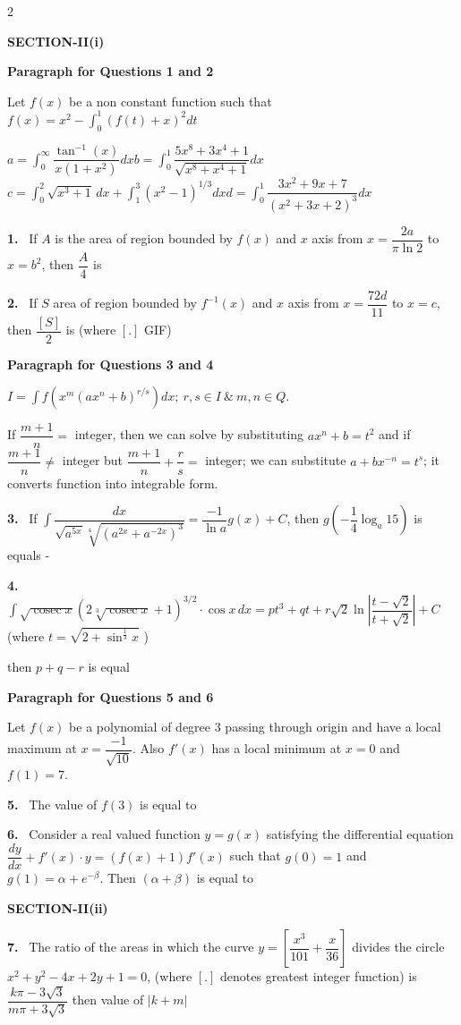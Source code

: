 \documentclass[10pt]{extarticle}
\newcommand{\sect}[1]{\par\smallskip\noindent\textbf{#1}\par}
\newcommand{\qn}[1]{\par\smallskip\noindent\textbf{#1.}~}
\newcommand{\paraq}[2]{\par\smallskip\noindent\textbf{Paragraph for Questions #1 and #2}\par}
\begin{document}
\begin{multicols}{2}
\sect{SECTION-II(i)}
\paraq{1}{2}
Let $f(x)$ be a non constant function such that $f(x)=x^2-\displaystyle\int_0^1(f(t)+x)^2dt$
\begin{center}
$a=\displaystyle\int_0^\infty\dfrac{\tan^{-1}(x)}{x(1+x^2)}dx$\hfill $b=\displaystyle\int_0^1\dfrac{5x^8+3x^4+1}{\sqrt{x^8+x^4+1}}dx$\\[6pt]
$c=\displaystyle\int_0^2\sqrt{x^3+1}\,dx+\int_1^3\left(x^2-1\right)^{1/3}dx$\hfill $d=\displaystyle\int_0^1\dfrac{3x^2+9x+7}{(x^2+3x+2)^3}dx$
\end{center}

\qn{1} If $A$ is the area of region bounded by $f(x)$ and $x$ axis from $x=\dfrac{2a}{\pi\ln2}$ to $x=b^2$, then $\dfrac{A}{4}$ is

\qn{2} If $S$ area of region bounded by $f^{-1}(x)$ and $x$ axis from $x=\dfrac{72d}{11}$ to $x=c$, then $\dfrac{[S]}{2}$ is (where $[.]$ GIF)

\paraq{3}{4}
$I=\displaystyle\int f\left(x^m(ax^n+b)^{r/s}\right)dx;\ r,s\in I\ \&\ m,n\in Q.$

If $\dfrac{m+1}{n}=$ integer, then we can solve by substituting $ax^n+b=t^2$ and if $\dfrac{m+1}{n}\ne$ integer but $\dfrac{m+1}{n}+\dfrac{r}{s}=$ integer; we can substitute $a+bx^{-n}=t^s$; it converts function into integrable form.

\qn{3} If $\displaystyle\int\dfrac{dx}{\sqrt{a^{5x}}\sqrt[4]{\left(a^{2x}+a^{-2x}\right)^3}}=\dfrac{-1}{\ln a}g(x)+C$, then $g\left(-\dfrac14\log_a15\right)$ is equals -

\qn{4} $\displaystyle\int\sqrt{\operatorname{cosec}x}\left(2\sqrt[3]{\operatorname{cosec}x}+1\right)^{3/2}\cdot\cos x\,dx=pt^3+qt+r\sqrt2\ln\left|\dfrac{t-\sqrt2}{t+\sqrt2}\right|+C$ (where $t=\sqrt{2+\sin^{\frac13}x}$ )

then $p+q-r$ is equal

\paraq{5}{6}
Let $f(x)$ be a polynomial of degree 3 passing through origin and have a local maximum at $x=\dfrac{-1}{\sqrt{10}}$. Also $f'(x)$ has a local minimum at $x=0$ and $f(1)=7$.

\qn{5} The value of $f(3)$ is equal to

\qn{6} Consider a real valued function $y=g(x)$ satisfying the differential equation $\dfrac{dy}{dx}+f'(x)\cdot y=(f(x)+1)f'(x)$ such that $g(0)=1$ and $g(1)=\alpha+e^{-\beta}$. Then $(\alpha+\beta)$ is equal to

\sect{SECTION-II(ii)}
\qn{7} The ratio of the areas in which the curve $y=\left[\dfrac{x^3}{101}+\dfrac{x}{36}\right]$ divides the circle $x^2+y^2-4x+2y+1=0$, (where $[.]$ denotes greatest integer function) is $\dfrac{k\pi-3\sqrt3}{m\pi+3\sqrt3}$ then value of $|k+m|$ \underline{\hspace{2.5em}}


\end{multicols}
\end{document}
